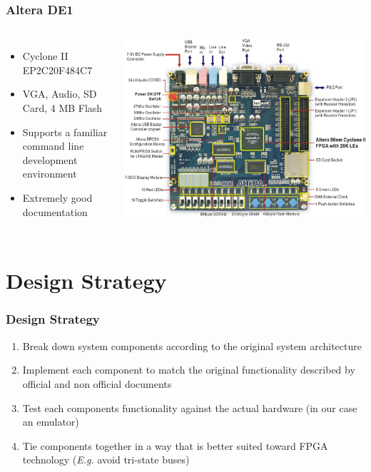 \documentclass{beamer}
\newlength{\wideitemsep}
\let\olditem\item
\renewcommand{\item}{\setlength{\itemsep}{\wideitemsep}\olditem}
\begin{document}
\begin{frame}
    \frametitle{Altera DE1}

    \begin{columns}[c]
            \begin{itemize}
                \item Cyclone II EP2C20F484C7
                \item VGA, Audio, SD Card, 4 MB Flash
                \item Supports a familiar command line development environment
                \item Extremely good documentation
            \end{itemize}

            \includegraphics[width=\textwidth]{../images/de1.jpg}
    \end{columns}
\end{frame}

\section{Design Strategy}
\begin{frame}
    \frametitle{Design Strategy}
    \begin{enumerate}
        \item<1-> Break down system components according to the original system architecture
        \item<2-> Implement each component to match the original functionality described by official and
            non official documents
        \item<3-> Test each components functionality against the actual hardware (in our case an emulator)
        \item<4-> Tie components together in a way that is better suited toward FPGA technology (\emph{E.g.} avoid tri-state buses)
    \end{enumerate}
\end{frame}
\end{document}
